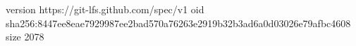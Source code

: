 version https://git-lfs.github.com/spec/v1
oid sha256:8447ee8eae7929987ee2bad570a76263e2919b32b3ad6a0d03026e79afbc4608
size 2078
